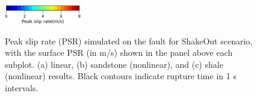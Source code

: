 
{}
\begin{figure}[!ht]
     \\[\baselineskip]%
     \\[\baselineskip]%
     \\[\baselineskip]%
    \vspace{-3mm}
    \centering
    \includegraphics[width=0.3\textwidth]{figures/figure_eks_1d.png}\label{fig:eks-1d}
    \caption{Peak slip rate (PSR) simulated on the fault for ShakeOut scenario, with the surface PSR (in m/s) shown in the panel above each subplot. (a) linear, (b) sandstone (nonlinear), and (c) shale (nonlinear) results. Black contours indicate rupture time in 1 s intervals.}
    \label{fig:eks-1}
\end{figure}
\clearpage

